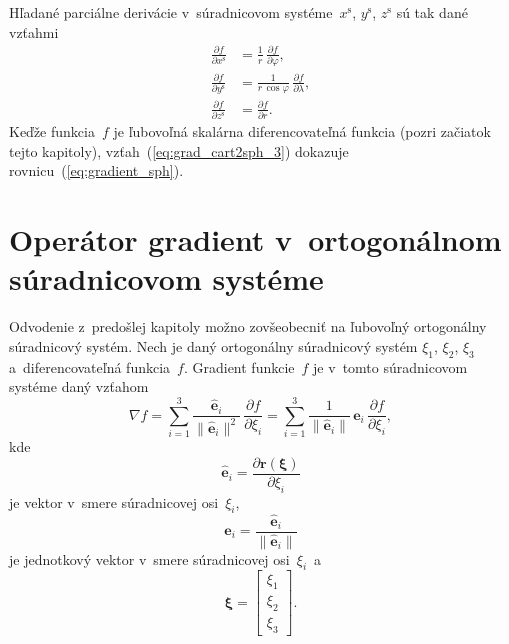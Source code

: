\documentclass[a4paper, 12pt]{book}
\let\vec\mathbf
\begin{document}
%
Hľadané parciálne derivácie v~súradnicovom systéme~$x^\mathrm{s}$, 
$y^\mathrm{s}$, $z^\mathrm{s}$ sú tak dané vzťahmi
%
\begin{equation}
\label{eq:lnof_diff_oeprators}
\begin{split}
\frac{\partial f}{\partial x^\mathrm{s}} &= \frac{1}{r} \, \frac{\partial 
f}{\partial \varphi}{,}\\
%
\frac{\partial f}{\partial y^\mathrm{s}} &= \frac{1}{r \, \cos\varphi} \, 
\frac{\partial f}{\partial \lambda}{,}\\
%
\frac{\partial f}{\partial z^\mathrm{s}} &= \frac{\partial f}{\partial r}{.}
\end{split}
\end{equation}
%
Keďže funkcia~$f$ je ľubovoľná skalárna diferencovateľná funkcia (pozri 
začiatok tejto kapitoly), vzťah~(\ref{eq:grad_cart2sph_3}) dokazuje 
rovnicu~(\ref{eq:gradient_sph}).




\section{Operátor gradient v~ortogonálnom súradnicovom systéme}
\label{app:gradient_in_orthogonal_coordinates}

Odvodenie z~predošlej kapitoly možno zovšeobecniť na ľubovoľný ortogonálny 
súradnicový systém.  Nech je daný ortogonálny súradnicový systém $\xi_1$, 
$\xi_2$, $\xi_3$ a~diferencovateľná funkcia~$f$.  Gradient funkcie~$f$ je 
v~tomto súradnicovom systéme daný vzťahom 
\parencite{Arfken2005,SansoGeoidDetermination}
%
\begin{equation}
\label{eq:grad_orthogonal_system}
\nabla f = \sum_{i = 1}^3 \frac{\hat{\vec e}_i}{\| \hat{\vec e}_i \|^2} \, 
\frac{\partial f}{\partial \xi_i} = \sum_{i = 1}^3 \frac{1}{\| \hat{\vec e}_i 
\|} \, \vec e_i \, \frac{\partial f}{\partial \xi_i}{,}
\end{equation}
%
kde
%
\begin{equation}
\label{eq:xi1xi2xi3_vectors}
\hat{\vec e}_i = \frac{\partial \vec r(\boldsymbol \xi)}{\partial \xi_i}
\end{equation}
%
je vektor v~smere súradnicovej osi~$\xi_i$,
%
\begin{equation}
\label{eq:xi1xi2xi3_unit_vectors}
\vec e_i = \frac{\hat{\vec e}_i}{\| \hat{\vec e}_i \|}
\end{equation}
%
je jednotkový vektor v~smere súradnicovej osi~$\xi_i$~a
%
\begin{equation}
\boldsymbol \xi =
%
\begin{bmatrix}
\xi_1\\
\xi_2\\
\xi_3
\end{bmatrix}
%
{.}
%
\end{equation}
\end{document}
